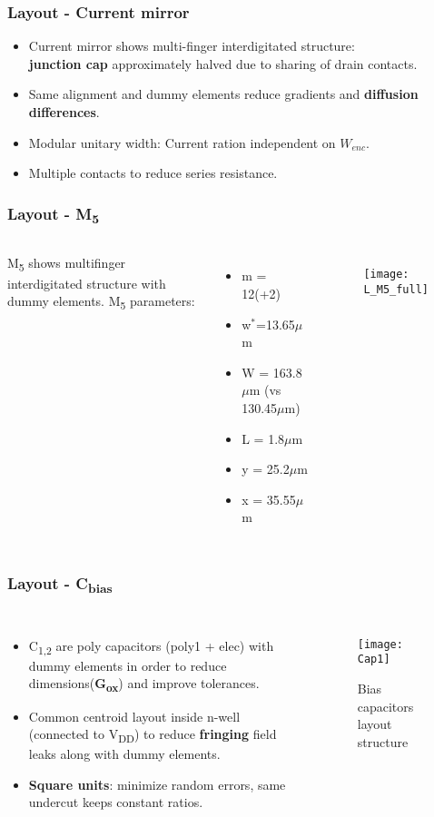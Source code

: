 \begin{frame}
\frametitle{Layout - Current mirror}
	\begin{itemize}
		\item Current mirror shows multi-finger interdigitated structure:\\ \textbf{junction cap} approximately halved due to sharing of drain contacts.
		\item Same alignment and dummy elements reduce gradients and \textbf{diffusion differences}.
		\item Modular unitary width: Current ration independent on \textbf{$W_{enc}$}.
		\item Multiple contacts to reduce series resistance.
	\end{itemize}
\end{frame}

\begin{frame}
	\frametitle{Layout - M\textsubscript{5}}
	\begin{columns}
		M\textsubscript{5} shows multifinger interdigitated structure with dummy 	elements. M\textsubscript{5} parameters:
		\begin{itemize}
			\item m = 12(+2)
			\item w$^*$=13.65$\mu$m
			\item W = 163.8$\mu$m (vs 130.45$\mu$m)
			\item L = 1.8$\mu$m
			\item y = 25.2$\mu$m
			\item x = 35.55$\mu$m
		\end{itemize}
		\begin{figure}[H]
			\centering
			\texttt{[image: L\_M5\_full]}
			\label{L_M5_full}
		\end{figure}
	\end{columns}
\end{frame}

\begin{frame}
\frametitle{Layout - C\textsubscript{bias}}
\begin{columns}
	\column{0.6\textwidth}
	\begin{itemize}
		\item C\textsubscript{1,2} are poly capacitors (poly1 + elec) with dummy elements in order to reduce dimensions(\textbf{G\textsubscript{ox}}) and improve tolerances. 
		\item Common centroid layout inside n-well (connected to V\textsubscript{DD}) to reduce \textbf{fringing} field leaks along with dummy elements.
		\item \textbf{Square units}: minimize random errors, same undercut keeps constant ratios.
	\end{itemize}
	\column{0.4\textwidth}
	\begin{figure}[H]
		\centering
		\texttt{[image: Cap1]}
		\caption{Bias capacitors layout structure}
		\label{Cap1}
	\end{figure}
\end{columns}
\end{frame}

